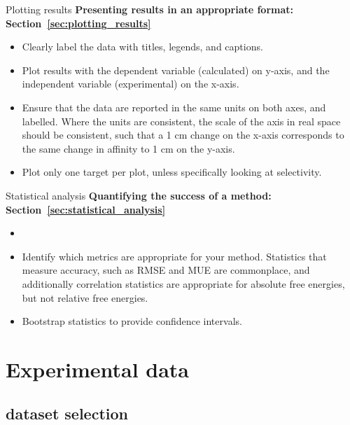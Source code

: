 \documentclass[9pt,bestpractices]{livecoms}
\begin{document}
\begin{Checklists*}


\begin{checklist}{Plotting results}
\textbf{Presenting results in an appropriate format: Section~\ref{sec:plotting_results}}
\begin{itemize}
\item Clearly label the data with titles, legends, and captions.
\item Plot results with the dependent variable (calculated) on y-axis, and the independent variable (experimental) on the x-axis. 
\item Ensure that the data are reported in the same units on both axes, and labelled. Where the units are consistent, the scale of the axis in real space should be consistent, such that a 1 cm change on the x-axis corresponds to the same change in affinity to 1 cm on the y-axis.
\item Plot only one target per plot, unless specifically looking at selectivity.
\end{itemize}
\end{checklist}

\begin{checklist}{Statistical analysis}
\textbf{Quantifying the success of a method: Section~\ref{sec:statistical_analysis}}
\begin{itemize}
\item 
\item Identify which metrics are appropriate for your method. Statistics that measure accuracy, such as RMSE and MUE are commonplace, and additionally correlation statistics are appropriate for absolute free energies, but not relative free energies.
\item Bootstrap statistics to provide confidence intervals. 
\end{itemize}
\end{checklist}


\end{Checklists*}







\section{Experimental data}
\subsection{dataset selection}
\end{document}
